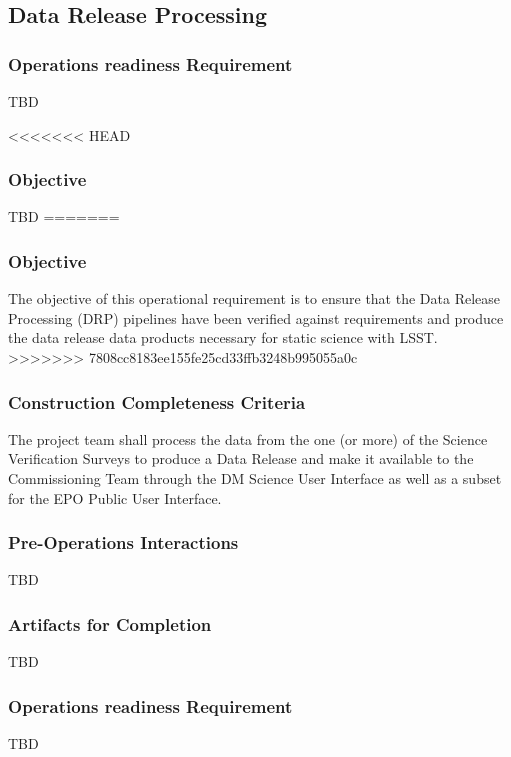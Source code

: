 
\subsection{Data Release Processing}

\subsubsection{Operations readiness Requirement}
TBD

<<<<<<< HEAD
\subsubsection{Objective} 
TBD
=======
\subsubsection{Objective}
The objective of this operational requirement is to ensure that the Data Release Processing (DRP) pipelines have been verified against requirements and produce the data release data products necessary for static science with LSST. 
>>>>>>> 7808cc8183ee155fe25cd33ffb3248b995055a0c

\subsubsection{Construction Completeness Criteria}
The project team shall process the data from the one (or more) of the Science Verification Surveys to produce a Data Release and make it available to the Commissioning Team through the DM Science User Interface as well as a subset for the EPO Public User Interface.

\subsubsection{Pre-Operations Interactions}
TBD

\subsubsection{Artifacts for Completion}
TBD

\subsubsection{Operations readiness Requirement}
TBD

